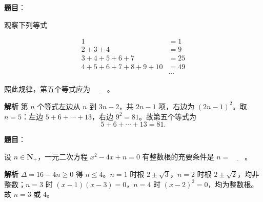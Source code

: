 \begin{answer}

\textbf{题目}：

观察下列等式

\nopagebreak[4]
\[\begin{aligned}
1&=1\\
2+3+4&=9\\
3+4+5+6+7&=25\\
4+5+6+7+8+9+10&=49\\
&\cdots
\end{aligned}\]

照此规律，第五个等式应为 $\underline{\qquad}$。

\textbf{解析}
第 $n$ 个等式左边从 $n$ 到 $3n-2$，共 $2n-1$ 项，右边为 $(2n-1)^2$。取 $n=5$：左边 $5+6+\cdots+13$，右边 $9^2=81$。故第五个等式为
\nopagebreak[4]
\[5+6+\cdots+13=81.\]


\end{answer}
\begin{answer}

\textbf{题目}：

设 $n\in\mathbf N_+$，一元二次方程 $x^2-4x+n=0$ 有整数根的充要条件是 $n=\underline{\qquad}$。

\textbf{解析}
$\Delta=16-4n\geqslant0$ 得 $n\leqslant4$。$n=1$ 时根 $2\pm\sqrt3$，$n=2$ 时根 $2\pm\sqrt2$，均非整数；$n=3$ 时 $(x-1)(x-3)=0$，$n=4$ 时 $(x-2)^2=0$，均为整数根。故 $n=3$ 或 $4$。


\end{answer}

